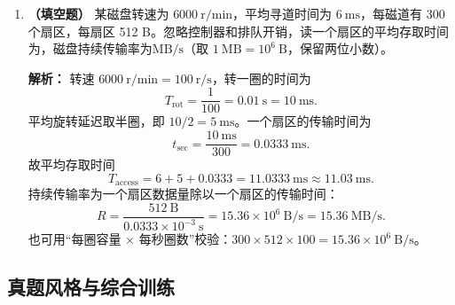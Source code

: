 \begin{enumerate}
\ifshowsolutions\par\noindent\textbf{解析：} DMA 分三段：预处理阶段 CPU 用 I/O 指令把主存起始地址、传送字数、方向等写入 DMAC 的地址寄存器和字计数器，是 CPU 设置 DMAC，不是 DMAC 设置 CPU，(A) 错。数据传送阶段由 DMAC 控制总线，在主存与外设之间直接搬运，CPU 不逐字执行指令，也不逐字进中断，(B)、(D) 错。整块传完后 DMAC 发一次中断，CPU 执行后处理程序检查有无错误、是否启动下一块，故 (C) 对。\else \answerarea \fi

\item \textbf{（填空题）} 某磁盘转速为 $6000\ \mathrm{r/min}$，平均寻道时间为 $6\ \mathrm{ms}$，每磁道有 300 个扇区，每扇区 512 B。忽略控制器和排队开销，读一个扇区的平均存取时间为\underline{\qquad\qquad}，磁盘持续传输率为\underline{\qquad\qquad}$\mathrm{MB/s}$（取 $1\ \mathrm{MB}=10^{6}\ \mathrm{B}$，保留两位小数）。

\ifshowsolutions\par\noindent\textbf{解析：} 转速 $6000\ \mathrm{r/min}=100\ \mathrm{r/s}$，转一圈的时间为
\[
T_{\text{rot}}=\frac{1}{100}=0.01\ \mathrm{s}=10\ \mathrm{ms}.
\]
平均旋转延迟取半圈，即 $10/2=5\ \mathrm{ms}$。一个扇区的传输时间为
\[
t_{\text{sec}}=\frac{10\ \mathrm{ms}}{300}=0.0333\ \mathrm{ms}.
\]
故平均存取时间
\[
T_{\text{access}}=6+5+0.0333=11.0333\ \mathrm{ms}\approx 11.03\ \mathrm{ms}.
\]
持续传输率为一个扇区数据量除以一个扇区的传输时间：
\[
R=\frac{512\ \mathrm{B}}{0.0333\times10^{-3}\ \mathrm{s}}
=15.36\times10^{6}\ \mathrm{B/s}=15.36\ \mathrm{MB/s}.
\]
也可用“每圈容量 $\times$ 每秒圈数”校验：$300\times512\times100=15.36\times10^{6}\ \mathrm{B/s}$。\par\noindent{}\else \answerarea \fi

\end{enumerate}

\subsection{真题风格与综合训练}

